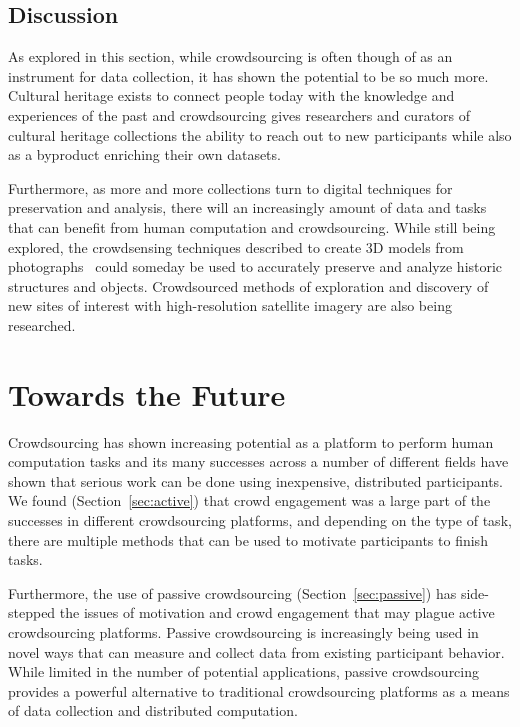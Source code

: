 \documentclass[10pt,twocolumn]{article}
\begin{document}
\subsection{Discussion}
As explored in this section, while crowdsourcing is often though of as an 
instrument for data collection, it has shown the potential to be so much more. 
Cultural heritage exists to connect people today with the knowledge and 
experiences of the past and crowdsourcing gives researchers and curators of 
cultural heritage collections the ability to reach out to new participants while 
also as a byproduct enriching their own datasets.

Furthermore, as more and more collections turn to digital techniques for 
preservation and analysis, there will an increasingly amount of data and tasks 
that can benefit from human computation and crowdsourcing. While still being 
explored, the crowdsensing techniques described to create 3D models from 
photographs~\cite{Agarwal2009} could someday be used to accurately preserve 
and analyze historic structures and objects. Crowdsourced methods of exploration 
and discovery of new sites of interest with high-resolution satellite imagery
are also being researched.


\section{Towards the Future}

Crowdsourcing has shown increasing potential as a platform to perform
human computation tasks and its many successes across a number of different 
fields have shown that serious work can be done using inexpensive, distributed 
participants. We found (Section~\ref{sec:active}) that crowd engagement was a 
large part of the successes in different crowdsourcing platforms, and depending 
on the type of task, there are multiple methods that can be used to motivate 
participants to finish tasks.

Furthermore, the use of passive crowdsourcing (Section~\ref{sec:passive}) has 
side-stepped the issues of motivation and crowd engagement that may plague 
active crowdsourcing platforms. Passive crowdsourcing is increasingly being used 
in novel ways that can measure and collect data from existing participant 
behavior. While limited in the number of potential applications, passive 
crowdsourcing provides a powerful alternative to traditional crowdsourcing 
platforms as a means of data collection and distributed computation.
\end{document}
